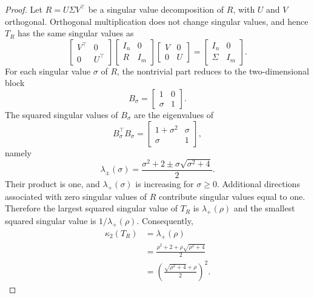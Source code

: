 \documentclass[AMA,Times1COL]{WileyNJDv5} %
\begin{document}
\begin{proof}
Let $R=U\Sigma V^\top$ be a singular value decomposition of $R$, with $U$ and $V$
orthogonal. Orthogonal multiplication does not change singular values, and hence
$T_R$ has the same singular values as
\begin{equation*}
\begin{bmatrix}
V^\top & 0\\
0 & U^\top
\end{bmatrix}
\begin{bmatrix}
I_n & 0\\
R & I_m
\end{bmatrix}
\begin{bmatrix}
V & 0\\
0 & U
\end{bmatrix}
=
\begin{bmatrix}
I_n & 0\\
\Sigma & I_m
\end{bmatrix}.
\end{equation*}
For each singular value $\sigma$ of $R$, the nontrivial part reduces to the two-dimensional
block
\begin{equation*}
B_\sigma=
\begin{bmatrix}
1 & 0\\
\sigma & 1
\end{bmatrix}.
\end{equation*}
The squared singular values of $B_\sigma$ are the eigenvalues of
\begin{equation*}
B_\sigma^\top B_\sigma=
\begin{bmatrix}
1+\sigma^2 & \sigma\\
\sigma & 1
\end{bmatrix},
\end{equation*}
namely
\begin{equation*}
\lambda_{\pm}(\sigma)=
\frac{\sigma^2+2\pm \sigma\sqrt{\sigma^2+4}}{2}.
\end{equation*}
Their product is one, and $\lambda_+(\sigma)$ is increasing for $\sigma\ge0$. Additional
directions associated with zero singular values of $R$ contribute singular values equal to
one. Therefore the largest squared singular value of $T_R$ is $\lambda_+(\rho)$ and the
smallest squared singular value is $1/\lambda_+(\rho)$. Consequently,
\begin{align*}
\kappa_2(T_R)
&=\lambda_+(\rho)\\
&=\frac{\rho^2+2+\rho\sqrt{\rho^2+4}}{2}\\
&=\left(\frac{\sqrt{\rho^2+4}+\rho}{2}\right)^2 .
\end{align*}
\end{proof}
\end{document}
